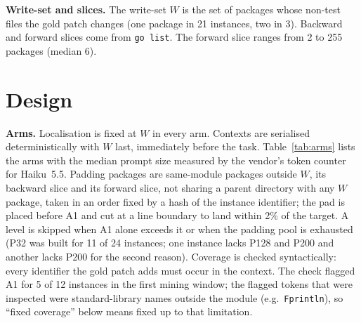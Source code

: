 \documentclass[10pt]{article}
\begin{document}
\textbf{Write-set and slices.} The write-set $W$ is the set of packages whose non-test files the gold patch changes (one package in 21 instances, two in 3). Backward and forward slices come from \texttt{go list}. The forward slice ranges from 2 to 255 packages (median 6).

\section{Design}

\textbf{Arms.} Localisation is fixed at $W$ in every arm. Contexts are serialised deterministically with $W$ last, immediately before the task. Table~\ref{tab:arms} lists the arms with the median prompt size measured by the vendor's token counter for Haiku~5.5. Padding packages are same-module packages outside $W$, its backward slice and its forward slice, not sharing a parent directory with any $W$ package, taken in an order fixed by a hash of the instance identifier; the pad is placed before A1 and cut at a line boundary to land within 2\% of the target. A level is skipped when A1 alone exceeds it or when the padding pool is exhausted (P32 was built for 11 of 24 instances; one instance lacks P128 and P200 and another lacks P200 for the second reason). Coverage is checked syntactically: every identifier the gold patch adds must occur in the context. The check flagged A1 for 5 of 12 instances in the first mining window; the flagged tokens that were inspected were standard-library names outside the module (e.g.\ \texttt{Fprintln}), so ``fixed coverage'' below means fixed up to that limitation.

\begin{table}[t]
\centering\footnotesize
{}
\caption{Arms. System prompt and task are included in the token counts.}
\label{tab:arms}
\end{table}
\end{document}
